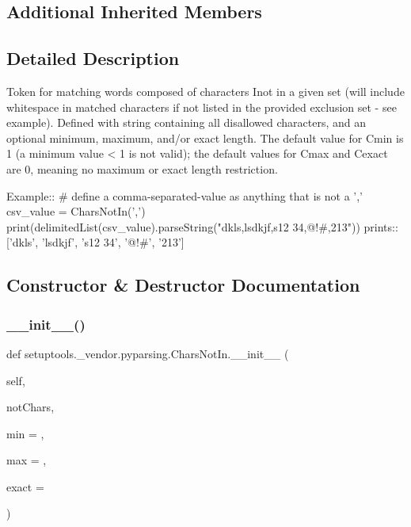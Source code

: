 \subsection*{Additional Inherited Members}


\subsection{Detailed Description}
\begin{DoxyVerb}Token for matching words composed of characters I{not} in a given set (will
include whitespace in matched characters if not listed in the provided exclusion set - see example).
Defined with string containing all disallowed characters, and an optional
minimum, maximum, and/or exact length.  The default value for C{min} is 1 (a
minimum value < 1 is not valid); the default values for C{max} and C{exact}
are 0, meaning no maximum or exact length restriction.

Example::
    # define a comma-separated-value as anything that is not a ','
    csv_value = CharsNotIn(',')
    print(delimitedList(csv_value).parseString("dkls,lsdkjf,s12 34,@!#,213"))
prints::
    ['dkls', 'lsdkjf', 's12 34', '@!#', '213']
\end{DoxyVerb}
 

\subsection{Constructor \& Destructor Documentation}
\mbox{\label{classsetuptools_1_1__vendor_1_1pyparsing_1_1CharsNotIn_a1aa8b49223feb8cc095a146acf54dfa8}} 
\subsubsection{\texorpdfstring{\+\_\+\+\_\+init\+\_\+\+\_\+()}{\_\_init\_\_()}}
{\footnotesize\ttfamily def setuptools.\+\_\+vendor.\+pyparsing.\+Chars\+Not\+In.\+\_\+\+\_\+init\+\_\+\+\_\+ (\begin{DoxyParamCaption}\item[{}]{self,  }\item[{}]{not\+Chars,  }\item[{}]{min = {},  }\item[{}]{max = {},  }\item[{}]{exact = {} }\end{DoxyParamCaption})}



